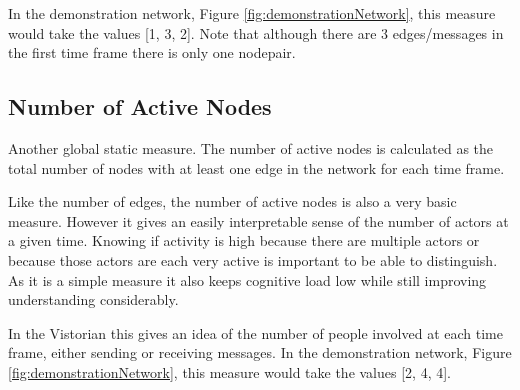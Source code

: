 In the demonstration network, Figure \ref{fig:demonstrationNetwork}, this measure would take the values [1, 3, 2]. Note that although there are 3 edges/messages in the first time frame there is only one nodepair.



\subsection{Number of Active Nodes}
Another global static measure. The number of active nodes is calculated as the total number of nodes with at least one edge in the network for each time frame.

Like the number of edges, the number of active nodes is also a very basic measure. However it gives an easily interpretable sense of the number of actors at a given time. Knowing if activity is high because there are multiple actors or because those actors are each very active is important to be able to distinguish. As it is a simple measure it also keeps cognitive load low while still improving understanding considerably.

In the Vistorian this gives an idea of the number of people involved at each time frame, either sending or receiving messages. 
In the demonstration network, Figure \ref{fig:demonstrationNetwork}, this measure would take the values [2, 4, 4]. 

